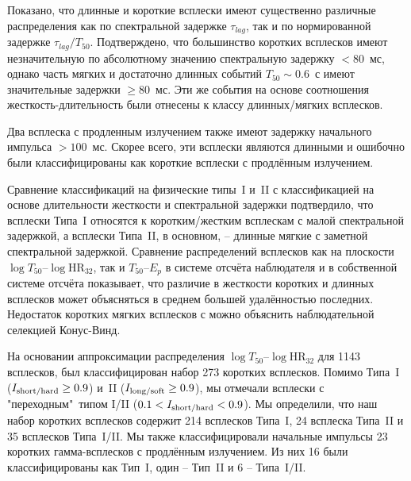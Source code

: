 Показано, что длинные и короткие всплески имеют существенно различные распределения как по спектральной задержке $\tau_{lag}$, так и по нормированной задержке $\tau_{lag} / T_{50}$. Подтверждено, что большинство коротких всплесков имеют незначительную по абсолютному значению спектральную задержку $< 80$~мс, однако часть мягких и достаточно длинных событий $T_{50}\sim 0.6$~с имеют значительные задержки $\geq 80$~мс. Эти же события на основе соотношения жесткость-длительность были отнесены к классу длинных/мягких всплесков. 

Два всплеска с продленным излучением также имеют задержку начального импульса $> 100$~мс. Скорее всего, эти всплески являются длинными и ошибочно были классифицированы как короткие всплески с продлённым излучением.  

Сравнение классификаций на физические типы~I и~II с классификацией на основе длительности жесткости и спектральной задержки подтвердило, что всплески Типа~I относятся к коротким/жестким всплескам с малой спектральной задержкой, а всплески Типа~II, в основном, -- длинные мягкие с заметной спектральной задержкой. Сравнение распределений всплесков как на плоскости $\log T_{50}$--$\log \mbox{HR}_{32}$, так и $T_{50}$--$E_p$ в системе отсчёта наблюдателя и в собственной системе отсчёта показывает, что различие в жесткости коротких и длинных всплесков может объясняться в среднем большей удалённостью последних. Недостаток коротких мягких всплесков с можно объяснить наблюдательной селекцией Конус-Винд.

На основании аппроксимации распределения $\log T_{50}$--$\log \mbox{HR}_{32}$ для 1143 всплесков, был классифицирован набор 273 коротких всплесков. Помимо Типа~I ($I_{\mbox{\scriptsize short/hard}} \geq 0.9$) и~II ($I_{\mbox{\scriptsize long/soft}} \geq 0.9$), мы отмечали всплески с "переходным"\ типом I/II ($0.1 < I_{\mbox{\scriptsize short/hard}} < 0.9$). Мы определили, что наш набор коротких всплесков содержит 214 всплесков Типа~I, 24 всплеска Типа~II и 35 всплесков Типа~I/II. Мы также классифицировали начальные импульсы 23 коротких гамма-всплесков с продлённым излучением. Из них 16 были классифицированы как Тип~I, один -- Тип~II и 6 -- Типа~I/II.

\clearpage